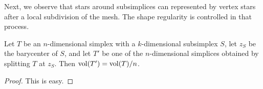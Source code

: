 \documentclass[10pt,letterpaper]{article}
\begin{document}



Next, we observe that stars around subsimplices can represented by vertex stars after a local subdivision of the mesh.
The shape regularity is controlled in that process. 

\begin{lemma}\label{lemma:stardivision}
    Let $T$ be an $n$-dimensional simplex with a $k$-dimensional subsimplex $S$,
    let $z_S$ be the barycenter of $S$, 
    and let $T'$ be one of the $n$-dimensional simplices obtained by splitting $T$ at $z_{S}$.
    Then $\operatorname{vol}(T') = \operatorname{vol}(T) / n$. 
\end{lemma}
\begin{proof}
    This is easy.
\end{proof}
\end{document}
